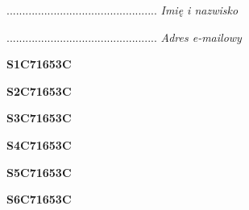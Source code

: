 \begin{turn}{90}\begin{minipage}{\linewidth} \vspace{20mm} ................................................  \textit{Imię i nazwisko}\end{minipage}\end{turn}

\begin{turn}{90}\begin{minipage}{\linewidth} \vspace{20mm} ................................................  \textit{Adres e-mailowy}\end{minipage}\end{turn}

\begin{turn}{90}\huge \begin{minipage}{\linewidth} \vspace{10mm}\textbf{S1C71653C}\end{minipage}\end{turn}

\begin{turn}{90}\huge \begin{minipage}{\linewidth} \vspace{10mm}\textbf{S2C71653C}\end{minipage}\end{turn}

\begin{turn}{90}\huge \begin{minipage}{\linewidth} \vspace{10mm}\textbf{S3C71653C}\end{minipage}\end{turn}

\begin{turn}{90}\huge \begin{minipage}{\linewidth} \vspace{10mm}\textbf{S4C71653C}\end{minipage}\end{turn}

\begin{turn}{90}\huge \begin{minipage}{\linewidth} \vspace{10mm}\textbf{S5C71653C}\end{minipage}\end{turn}

\begin{turn}{90}\huge \begin{minipage}{\linewidth} \vspace{10mm}\textbf{S6C71653C}\end{minipage}\end{turn}

